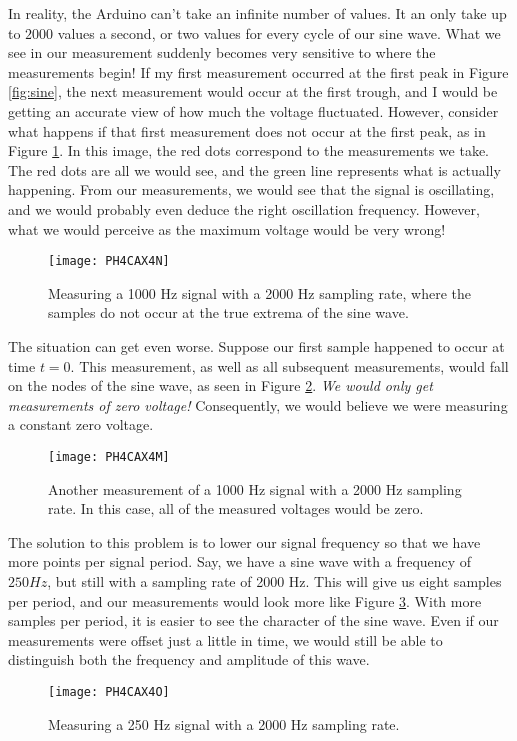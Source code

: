 In reality, the Arduino can't take an infinite number of values.
It an only take up to $2000$ values a second, or two values for every cycle of
our sine wave. What we see in our measurement suddenly becomes very sensitive 
to where the measurements begin! If my first measurement occurred at the 
first peak in Figure \ref{fig:sine}, the next measurement would occur at
the first trough, and I would be getting an accurate view of how much the 
voltage fluctuated. However, consider what happens if that first measurement
does not occur at the first peak, as in Figure \ref{fig:sine2}. In this image,
the red dots correspond to the measurements we take. The red dots are all we
would see, and the green line represents what is actually happening. From
our measurements, we would see that the signal is oscillating, and we would
probably even deduce the right oscillation frequency. However, what we would
perceive as the maximum voltage would be very wrong!
\begin{figure}[htbp!]
	\centering
\texttt{[image: PH4CAX4N]}
	\caption[Measuring a 1000 Hz signal with a 2000 Hz sampling rate]
	{Measuring a 1000 Hz signal with a 2000 Hz sampling rate, where the
	samples do not occur at the true extrema of the sine wave.}
	\label{fig:sine2}
\end{figure}

The situation can get even worse. Suppose our first sample happened to 
occur at time $t=0$. This measurement, as well as all subsequent measurements,
would fall on the nodes of the sine wave, as seen in Figure
\ref{fig:sine3}. \emph{We would only get measurements
of zero voltage!} Consequently, we would believe we were measuring a constant
zero voltage.
\begin{figure}[htbp!]
	\centering
\texttt{[image: PH4CAX4M]}
	\caption[Another measurement of a 1000 Hz signal with a 2000 Hz 
	sampling rate]{Another measurement of a 1000 Hz signal with a 2000 Hz
        sampling rate. In this case, all of the measured voltages would be
	zero.}
	\label{fig:sine3}
\end{figure}

The solution to this problem is to lower our signal frequency so
that we have more points per signal period. Say, we have a sine wave with a
frequency of $250\unit{Hz}$, but still with a sampling rate of 2000 Hz. This
will give us eight samples per period, and our measurements would look more 
like Figure \ref{fig:sine4}. With more samples per period, it is easier to see
the character of the sine wave. Even if our measurements were offset just 
a little in time, we would still be able to distinguish both the frequency 
and amplitude of this wave.
\begin{figure}[htbp!]
	\centering
\texttt{[image: PH4CAX4O]}
	\caption{Measuring a 250 Hz signal with a 2000 Hz sampling rate.}
	\label{fig:sine4}
\end{figure}

